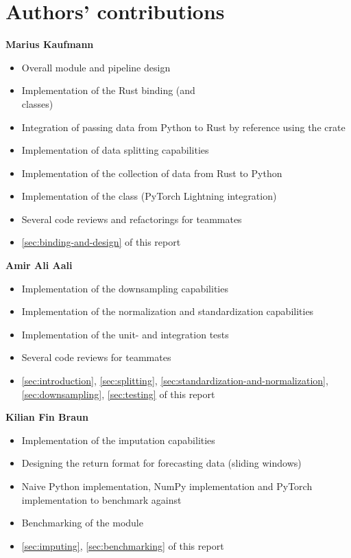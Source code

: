 \documentclass[review]{AIM_report}
\begin{document}
\newpage
\section{Authors' contributions}

\textbf{Marius Kaufmann}
\begin{itemize}
    \item Overall module and pipeline design
    \item Implementation of the Rust binding (\forecastingDataSet and \\\classificationDataSet classes)
    \item Integration of passing data from Python to Rust by reference using the \numpy crate
    \item Implementation of data splitting capabilities
    \item Implementation of the collection of data from Rust to Python
    \item Implementation of the \rustDM class (PyTorch Lightning integration)
    \item Several code reviews and refactorings for teammates
    \item \autoref{sec:binding-and-design} of this report
\end{itemize}

\textbf{Amir Ali Aali}
\begin{itemize}
    \item Implementation of the downsampling capabilities
    \item Implementation of the normalization and standardization capabilities
    \item Implementation of the unit- and integration tests
    \item Several code reviews for teammates
    \item \autoref{sec:introduction}, \autoref{sec:splitting}, \autoref{sec:standardization-and-normalization}, \autoref{sec:downsampling}, \autoref{sec:testing} of this report
\end{itemize}

\textbf{Kilian Fin Braun}
\begin{itemize}
    \item Implementation of the imputation capabilities
    \item Designing the return format for forecasting data (sliding windows)
    \item Naive Python implementation, NumPy implementation and PyTorch implementation to benchmark against
    \item Benchmarking of the module
    \item \autoref{sec:imputing}, \autoref{sec:benchmarking} of this report
\end{itemize}
\end{document}
